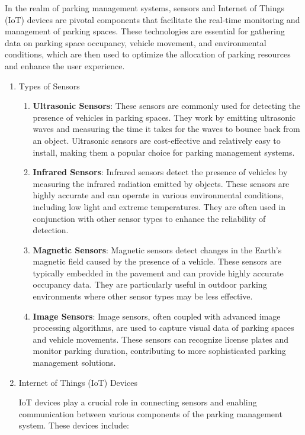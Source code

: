 \documentclass[oneside, 12pt, a4paper, draft]{book}
\begin{document}
In the realm of parking management systems, sensors and Internet of Things (IoT) devices are pivotal components that facilitate the real-time monitoring and management of parking spaces. These technologies are essential for gathering data on parking space occupancy, vehicle movement, and environmental conditions, which are then used to optimize the allocation of parking resources and enhance the user experience.
\begin{enumerate}
\item Types of Sensors
\label{sec:orgd46063c}

\begin{enumerate}
\item \textbf{Ultrasonic Sensors}: These sensors are commonly used for detecting the presence of vehicles in parking spaces. They work by emitting ultrasonic waves and measuring the time it takes for the waves to bounce back from an object. Ultrasonic sensors are cost-effective and relatively easy to install, making them a popular choice for parking management systems.

\item \textbf{Infrared Sensors}: Infrared sensors detect the presence of vehicles by measuring the infrared radiation emitted by objects. These sensors are highly accurate and can operate in various environmental conditions, including low light and extreme temperatures. They are often used in conjunction with other sensor types to enhance the reliability of detection.

\item \textbf{Magnetic Sensors}: Magnetic sensors detect changes in the Earth's magnetic field caused by the presence of a vehicle. These sensors are typically embedded in the pavement and can provide highly accurate occupancy data. They are particularly useful in outdoor parking environments where other sensor types may be less effective.

\item \textbf{Image Sensors}: Image sensors, often coupled with advanced image processing algorithms, are used to capture visual data of parking spaces and vehicle movements. These sensors can recognize license plates and monitor parking duration, contributing to more sophisticated parking management solutions.
\end{enumerate}
\item Internet of Things (IoT) Devices
\label{sec:org8c114d7}

IoT devices play a crucial role in connecting sensors and enabling communication between various components of the parking management system. These devices include:


\end{enumerate}
\end{document}
